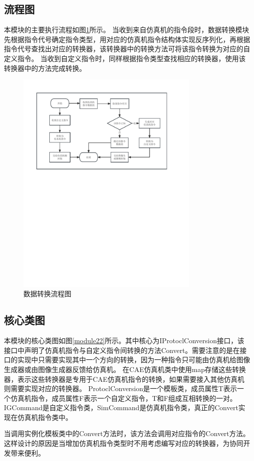 \subsection{流程图}
\par
本模块的主要执行流程如图\ref{module21}所示。
当收到来自仿真机的指令段时，数据转换模块先根据指令代号确定指令类型，用对应的仿真机指令结构体实现反序列化，再根据指令代号查找出对应的转换器，该转换器中的转换方法可将该指令转换为对应的自定义指令。
当收到自定义指令时，同样根据指令类型查找相应的转换器，使用该转换器中的方法完成转换。
\begin{figure}[h!]
    \begin{center}
        \includegraphics[width=0.8\textwidth]{pictures/flowchart2.pdf}
        \caption{数据转换流程图}
        \label{module21}
    \end{center}
\end{figure}
\subsection{核心类图}
\par
本模块的核心类图如图\ref{module22}所示。其中核心为IProtoclConversion接口，该接口中声明了仿真机指令与自定义指令间转换的方法Convert。需要注意的是在接口的实现中只需要实现其中一个方向的转换，因为一种指令只可能由仿真机给图像生成器或由图像生成器反馈给仿真机。
在CAE仿真机类中使用map存储这些转换器，表示这些转换器是专用于CAE仿真机指令的转换，如果需要接入其他仿真机则需要实现对应的转换器。
ProtoclConversion是一个模板类，成员属性T表示一个仿真机指令，成员属性F表示一个自定义指令，T和F组成互相转换的一对。
IGCommand是自定义指令类，SimCommand是仿真机指令类，真正的Convert实现在仿真机指令类中。
\par
当调用实例化模板类中的Convert方法时，该方法会调用对应指令的Convert方法。
这样设计的原因是当增加仿真机指令类型时不用考虑编写对应的转换器，为协同开发带来便利。

